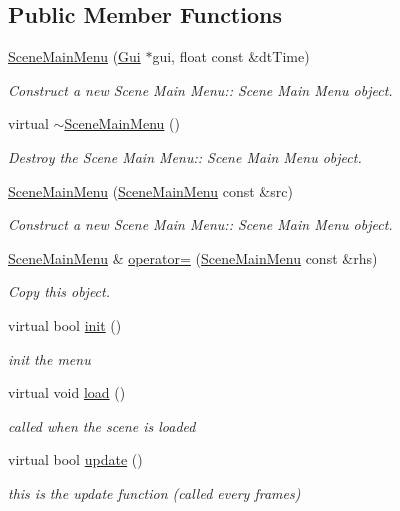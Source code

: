 \subsection*{Public Member Functions}
\begin{DoxyCompactItemize}
\item 
\hyperlink{class_scene_main_menu_a7ace033e087eee777e1145c9355b7264}{Scene\+Main\+Menu} (\hyperlink{class_gui}{Gui} $\ast$gui, float const \&dt\+Time)
\begin{DoxyCompactList}\small\item\em Construct a new Scene Main Menu\+:\+: Scene Main Menu object. \end{DoxyCompactList}\item 
\mbox{\label{class_scene_main_menu_a94a8510c89e1e113cc5453de9bbdec3e}} 
virtual \hyperlink{class_scene_main_menu_a94a8510c89e1e113cc5453de9bbdec3e}{$\sim$\+Scene\+Main\+Menu} ()
\begin{DoxyCompactList}\small\item\em Destroy the Scene Main Menu\+:\+: Scene Main Menu object. \end{DoxyCompactList}\item 
\hyperlink{class_scene_main_menu_a009e4094fbfa50f69b1f38f021d882c6}{Scene\+Main\+Menu} (\hyperlink{class_scene_main_menu}{Scene\+Main\+Menu} const \&src)
\begin{DoxyCompactList}\small\item\em Construct a new Scene Main Menu\+:\+: Scene Main Menu object. \end{DoxyCompactList}\item 
\hyperlink{class_scene_main_menu}{Scene\+Main\+Menu} \& \hyperlink{class_scene_main_menu_a22561df776a39ac604fcd26793875046}{operator=} (\hyperlink{class_scene_main_menu}{Scene\+Main\+Menu} const \&rhs)
\begin{DoxyCompactList}\small\item\em Copy this object. \end{DoxyCompactList}\item 
virtual bool \hyperlink{class_scene_main_menu_a11f68db49f9bf996efb0ce14913e5580}{init} ()
\begin{DoxyCompactList}\small\item\em init the menu \end{DoxyCompactList}\item 
\mbox{\label{class_scene_main_menu_ab72e5368cb7e5971e1f0cd5a662289c6}} 
virtual void \hyperlink{class_scene_main_menu_ab72e5368cb7e5971e1f0cd5a662289c6}{load} ()
\begin{DoxyCompactList}\small\item\em called when the scene is loaded \end{DoxyCompactList}\item 
virtual bool \hyperlink{class_scene_main_menu_a5d095883d0b1fceb3125ef2689a7a09c}{update} ()
\begin{DoxyCompactList}\small\item\em this is the update function (called every frames) \end{DoxyCompactList}\end{DoxyCompactItemize}
